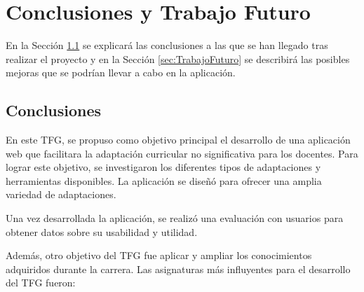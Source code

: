 \chapter{Conclusiones y Trabajo Futuro}
\label{cap:conclusiones}

En la Sección \ref{sec:conclusiones} se explicará las conclusiones a las que se han llegado tras realizar el proyecto y en la Sección \ref{sec:TrabajoFuturo} se describirá las posibles mejoras que se podrían llevar a cabo en la aplicación.

\section{Conclusiones}
\label{sec:conclusiones}
En este TFG, se propuso como objetivo principal el desarrollo de una aplicación web que facilitara la adaptación curricular no significativa para los docentes. Para lograr este objetivo, se investigaron los diferentes tipos de adaptaciones y herramientas disponibles. La aplicación se diseñó para ofrecer una amplia variedad de adaptaciones.

Una vez desarrollada la aplicación, se realizó una evaluación con usuarios para obtener datos sobre su usabilidad y utilidad.

Además, otro objetivo del TFG fue aplicar y ampliar los conocimientos adquiridos durante la carrera. Las asignaturas más influyentes para el desarrollo del TFG fueron:

